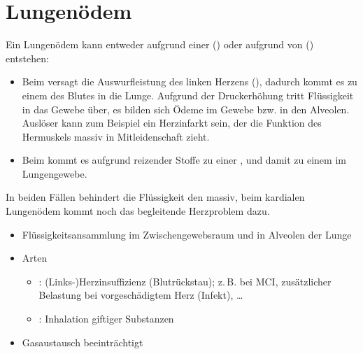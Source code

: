 \section{Lungenödem}
\label{topic:lungenoedem}

\nopagebreak

{%
Ein Lungenödem kann entweder aufgrund einer
 () oder aufgrund
  von  ()
entstehen:
\begin{itemize}
  \item Beim  versagt die Auswurfleistung
  des linken Herzens (), dadurch
  kommt es zu einem  des Blutes in die Lunge.
  Aufgrund der Druckerhöhung tritt Flüssigkeit in das Gewebe
  über, es bilden sich Ödeme im Gewebe bzw.
   in den Alveolen. Auslöser kann
  zum Beispiel ein Herzinfarkt sein, der die Funktion des
  Hermuskels massiv in Mitleidenschaft zieht.
  \item Beim  kommt es aufgrund reizender
  Stoffe zu einer , und damit zu einem
   im Lungengewebe.
\end{itemize}
In beiden Fällen behindert die Flüssigkeit den
 massiv, beim kardialen Lungenödem kommt
noch das begleitende Herzproblem dazu.

}{
\begin{itemize}
  \item Flüssigkeitsansammlung im Zwischengewebsraum und in 
  Alveolen der Lunge
  \item Arten
  \begin{itemize}
    \item {}: (Links-)Herzinsuffizienz (Blutrückstau); 
    z.\,B. bei MCI, zusätzlicher Belastung bei vorgeschädigtem Herz
    (Infekt), \ldots
    \item {}: Inhalation giftiger Substanzen
  \end{itemize}
  \item Gasaustausch beeinträchtigt
\end{itemize}

}{}{}{}




